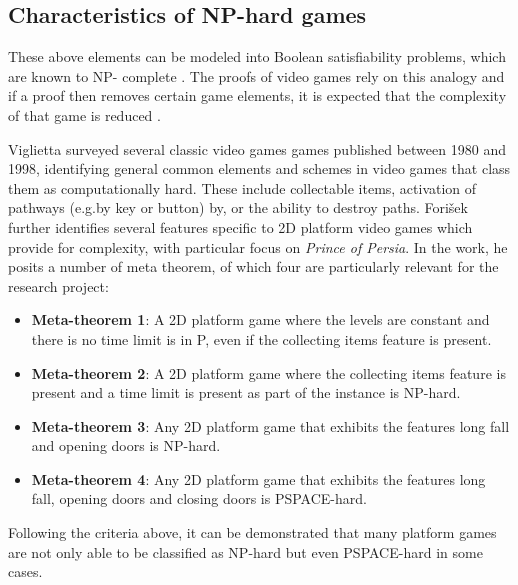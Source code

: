 \documentclass[11pt, a4paper, oneside]{report} %
\begin{document}
\subsection{Characteristics of NP-hard games}

These above elements can be modeled into Boolean satisfiability problems, which
are known to NP- complete \cite{DBLP:conf/fun/Forisek10, cook1971complexity}.
The proofs of video games rely on this analogy and if a proof then removes
certain game elements, it is expected that the complexity of that game is
reduced \cite{viglietta2014gaming}.

Viglietta \cite{viglietta2014gaming} surveyed several classic video games games
published between 1980 and 1998, identifying general common elements and schemes
in video games that class them as computationally hard. These include
collectable items, activation of pathways (e.g.by key or button) by, or the
ability to destroy paths. Fori\v{s}ek \@\cite{DBLP:conf/fun/Forisek10} further
identifies several features specific to 2D platform video games which provide
for complexity, with particular focus on \textit{Prince of Persia}. In the work,
he posits a number of meta theorem, of which four are particularly relevant for
the research project:

\begin{itemize}

  \item \textbf{Meta-theorem 1}: A 2D platform game where the levels are constant and there is no
                                time limit is in P, even if the collecting items feature is present.

  \item \textbf{Meta-theorem 2}: A 2D platform game where the collecting items feature is present
                                 and a time limit is present as part of the instance is NP-hard.


  \item \textbf{Meta-theorem 3}: Any 2D platform game that exhibits the features long fall and
                                 opening doors is NP-hard.


  \item \textbf{Meta-theorem 4}: Any 2D platform game that exhibits the features long fall, opening
                                 doors and closing doors is PSPACE-hard.

\end{itemize}


Following the criteria above, it can be demonstrated that many platform games are not only able to be
classified as NP-hard but even PSPACE-hard in some cases.
\end{document}
